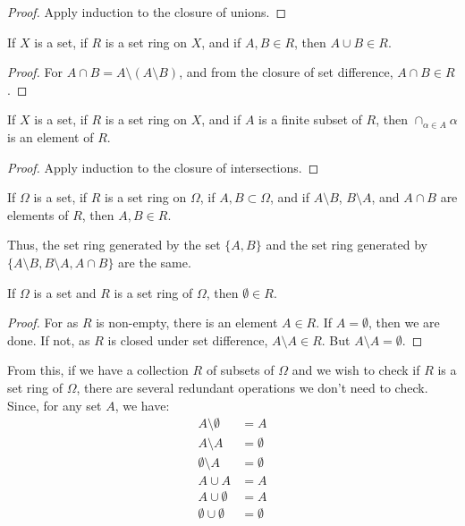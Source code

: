     \begin{proof}
        Apply induction to the closure of unions.
    \end{proof}
    \begin{theorem}
        If $X$ is a set, if $R$ is a set ring on $X$, and if
        $A,B\in{R}$, then $A\cup{B}\in{R}$.
    \end{theorem}
    \begin{proof}
        For $A\cap{B}=A\setminus(A\setminus{B})$, and from the closure of set
        difference, $A\cap{B}\in{R}$.
    \end{proof}
    \begin{theorem}
        If $X$ is a set, if $R$ is a set ring on $X$, and if $A$ is a finite
        subset of $R$, then $\cap_{\alpha\in{A}}\alpha$ is an element of $R$.
    \end{theorem}
    \begin{proof}
        Apply induction to the closure of intersections.
    \end{proof}
    \begin{theorem}
        If $\Omega$ is a set, if $R$ is a set ring on
        $\Omega$, if $A,B\subset\Omega$, and if
        $A\setminus{B}$, $B\setminus{A}$, and
        $A\cap{B}$ are elements of $R$, then
        $A,B\in{R}$.
    \end{theorem}
    Thus, the set ring generated by the set $\{A,B\}$ and
    the set ring generated by
    $\{A\setminus{B},B\setminus{A},A\cap{B}\}$ are the
    same.
    \begin{theorem}
        If $\Omega$ is a set and $R$ is a set ring
        of $\Omega$, then $\emptyset\in{R}$.
    \end{theorem}
    \begin{proof}
        For as $R$ is non-empty, there is an element
        $A\in{R}$. If $A=\emptyset$, then we are done.
        If not, as $R$ is closed under set difference,
        $A\setminus{A}\in{R}$. But
        $A\setminus{A}=\emptyset$.
    \end{proof}
    From this, if we have a collection $R$ of subsets of
    $\Omega$ and we wish to check if $R$ is a set ring
    of $\Omega$, there are several redundant operations
    we don't need to check. Since, for any set $A$,
    we have:
    \begin{align}
        A\setminus\emptyset&=A\\
        A\setminus{A}&=\emptyset\\
        \emptyset\setminus{A}&=\emptyset\\
        A\cup{A}&=A\\
        A\cup\emptyset&=A\\
        \emptyset\cup\emptyset&=\emptyset
    \end{align}
